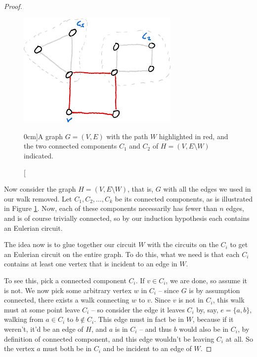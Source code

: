 \documentclass[nobib]{tufte-handout}
\begin{document}
\begin{theorem}[Euler (1736)]
\begin{proof}
    \begin{figure}
      \centering
      \includegraphics[width=0.7\textwidth]{graphics/L2_eulerianity_subgraphs/eulerianity_connected_components.png}
      \caption[][0cm]{A graph $G = (V,E)$ with the path $W$ highlighted in red, and the two connected components $C_1$ and $C_2$ of $H = (V, E \setminus W)$ indicated.}
      \label{fig:euler_proof_connected_components}
    \end{figure}

    Now consider the graph $H = (V, E \setminus W)$, that is, $G$ with all the edges we used in our walk removed. Let $C_1, C_2, \ldots, C_k$ be its connected components, as is illustrated in Figure \ref{fig:euler_proof_connected_components}. Now, each of these components necessarily has fewer than $n$ edges, and is of course trivially connected, so by our induction hypothesis each contains an Eulerian circuit.

    The idea now is to glue together our circuit $W$ with the circuits on the $C_i$ to get an Eulerian circuit on the entire graph. To do this, what we need is that each $C_i$ contains at least one vertex that is incident to an edge in $W$.

    To see this, pick a connected component $C_i$. If $v \in C_i$, we are done, so assume it is not. We now pick some arbitrary vertex $w$ in $C_i$ -- since $G$ is by assumption connected, there exists a walk connecting $w$ to $v$. Since $v$ is not in $C_i$, this walk must at some point leave $C_i$ -- so consider the edge it leaves $C_i$ by, say, $e = \{a,b\}$, walking from $a \in C_i$ to $b \not\in C_i$. This edge must in fact be in $W$, because if it weren't, it'd be an edge of $H$, and $a$ is in $C_i$ -- and thus $b$ would also be in $C_i$, by definition of connected component, and this edge wouldn't be leaving $C_i$ at all. So the vertex $a$ must both be in $C_i$ and be incident to an edge of $W$.


\end{proof}
\end{theorem}
\end{document}
